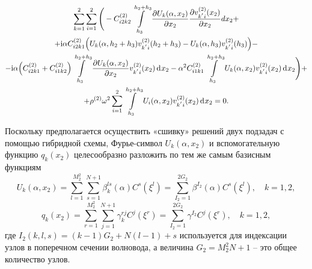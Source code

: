 \documentclass[press]{vestnik}
\begin{document}
\begin{multline} \label{weak_form_U_k}
		\sum_{k=1}^{2} \sum_{i=1}^{2} 
		\Bigg(
		-C_{i2k2}^{(2)} \int\limits_{h_{3}}^{h_{2}+h_{3}} \frac{\partial U_{k}(\alpha,x_{2}) }{\partial x_{2} } \frac{\partial v_{k^{'}i}^{(2)}(x_{2}) }{\partial x_{2} } d x_{2} +
		\\
		+{\rm{i}} \alpha C_{i2k1}^{(2)} 
		\Big(
		U_{k}(\alpha,h_{2}+h_{3})v_{k^{'}i}^{(2)}(h_{2}+h_{3}) - U_{k}(\alpha,h_{3}) v_{k^{'}i}^{(2)}(h_{3}) 
		\Big) -
		\\
		- {\rm{i}} \alpha \Big( C_{i2k1}^{(2)} +C_{i1k2}^{(2)} \Big) \int\limits_{h_{3}}^{h_{2}+h_{3}} \frac{\partial U_{k}(\alpha,x_{2}) }{\partial x_{2} } v_{k^{'}i}^{(2)}(x_{2}) \d x_{2}
		- \alpha^{2} C_{i1k1}^{(2)} \int\limits_{h_{3}}^{h_{2}+h_{3}} U_{k}(\alpha,x_{2}) v_{k^{'}i}^{(2)}(x_{2}) \d x_{2}
		\Bigg) +
		\\
		+\rho^{(2)} \omega^{2} \sum_{i=1}^{2} \int\limits_{h_{3}}^{h_{2}+h_{3}} U_{i}(\alpha,x_{2}) v_{k^{'}i}^{(2)}(x_{2}) \d x_{2} = 0.
\end{multline}

Поскольку предполагается осуществить «сшивку» решений двух подзадач с помощью гибридной схемы, Фурье-символ $U_{k}(\alpha,x_{2})$ и вспомогательную функцию $q_{k}(x_{2})$ целесообразно разложить по тем же самым базисным функциям
\begin{equation} \label{U_k}
	U_{k}(\alpha,x_2)  =  \sum_{l=1}^{M_{2}^{2}} \sum_{s=1}^{N+1} \beta_{k}^{ls}(\alpha) C^{s}(\xi^l)
	= \sum_{I_2=1}^{2G_{2}} \beta^{I_2}(\alpha) C^{s}(\xi^l), \quad k=1, 2,
\end{equation}
\begin{equation} \label{q_k}
	  q_{k}(x_2) = \sum_{r=1}^{M_{2}^{2}} \sum_{j=1}^{N+1} \gamma_{k}^{rj} C^{j}(\xi^r) = \sum_{I_2=1}^{2G_{2}} \gamma^{I_2} C^{j}(\xi^r), \quad k=1, 2,
\end{equation}
где $I_2(k,l,s) = (k-1)G_{2}+N(l-1)+s$ используется для индексации узлов в поперечном сечении волновода, а величина $G_{2}=M_{2}^{2}N+1$ -- это общее количество узлов.
\end{document}
